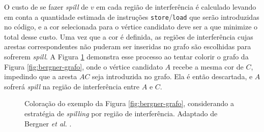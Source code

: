 \documentclass[
	12pt,				%
	openright,			%
	oneside,			%
	a4paper,			%
	tccpreliminar,			%
	]{ABNT-DC-UEL}
\begin{document}
O custo de se fazer \textit{spill} de $v$ em cada região de interferência é calculado levando em conta a quantidade estimada de instruções \texttt{store}/\texttt{load} que serão introduzidas no código, e a cor selecionada para o vértice candidato deve ser a que minimize o total desse custo. Uma vez que a cor é definida, as regiões de interferência cujas arestas correspondentes não puderam ser inseridas no grafo são escolhidas para sofrerem \textit{spill}. A Figura \ref{fig:bergner-grafo-col} demonstra esse processo ao tentar colorir o grafo da Figura \ref{fig:bergner-grafo}, onde o vértice candidato $A$ recebe a mesma cor de $C$, impedindo que a aresta $AC$ seja introduzida no grafo. Ela é então descartada, e $A$ sofrerá \textit{spill} na região de interferência entre $A$ e $C$.

\begin{figure}[hbt]
    \centering
    \begin{subfigure}{0.44\textwidth}
        \centering
    \end{subfigure}
    \begin{subfigure}{0.1\textwidth}
        \centering
    \end{subfigure}
    \begin{subfigure}{0.44\textwidth}
        \centering
    \end{subfigure}
    \caption{Coloração do exemplo da Figura \ref{fig:bergner-grafo}, considerando a estratégia de \textit{spilling} por região de interferência. Adaptado de Bergner \textit{et al.} \cite{bergner:97}.}
    \label{fig:bergner-grafo-col}
\end{figure}
\end{document}
